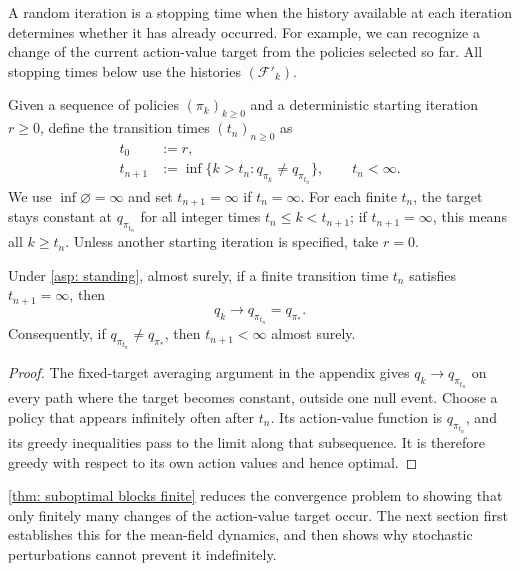 A random iteration is a stopping time when the history available at each iteration determines whether it has already occurred. For example, we can recognize a change of the current action-value target from the policies selected so far. All stopping times below use the histories $(\mathcal F'_k)$.

\begin{definition}
\label{def: transition times}
Given a sequence of policies $(\pi_k)_{k \ge 0}$ and a deterministic starting iteration $r\ge0$,
define the transition times $(t_n)_{n \ge 0}$ as
\begin{align*}
t_0 &:= r ,
\\
t_{n+1} &:= \inf\{k>t_n : q_{\pi_k} \neq q_{\pi_{t_n}} \},\qquad t_n<\infty.
\end{align*}
We use $\inf\varnothing=\infty$ and set $t_{n+1}=\infty$ if $t_n=\infty$.
For each finite $t_n$, the target stays constant at $q_{\pi_{t_n}}$ for all integer times $t_n\le k<t_{n+1}$; if $t_{n+1}=\infty$, this means all $k\ge t_n$. Unless another starting iteration is specified, take $r=0$.
\end{definition}

\begin{lemma}
\label{thm: suboptimal blocks finite}
Under \autoref{asp: standing}, almost surely, if a finite transition time $t_n$ satisfies $t_{n+1}=\infty$, then
\[
q_k\longrightarrow q_{\pi_{t_n}}=q_{\pi_*}.
\]
Consequently, if $q_{\pi_{t_n}}\ne q_{\pi_*}$, then $t_{n+1}<\infty$ almost surely.
\end{lemma}
\begin{proof}
The fixed-target averaging argument in the appendix gives $q_k\to q_{\pi_{t_n}}$ on every path where the target becomes constant, outside one null event.
Choose a policy that appears infinitely often after $t_n$. Its action-value function is $q_{\pi_{t_n}}$, and its greedy inequalities pass to the limit along that subsequence. It is therefore greedy with respect to its own action values and hence optimal.
\end{proof}

\autoref{thm: suboptimal blocks finite} reduces the convergence problem to showing that only finitely many changes of the action-value target occur. The next section first establishes this for the mean-field dynamics, and then shows why stochastic perturbations cannot prevent it indefinitely.

